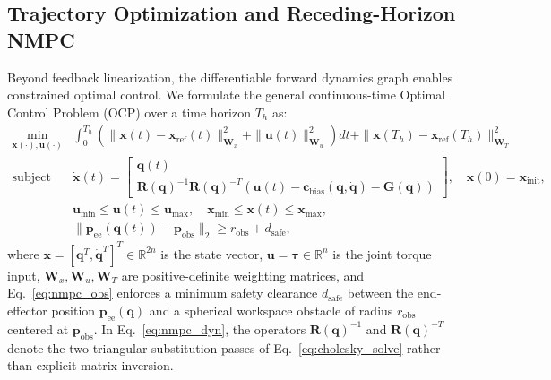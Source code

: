 \documentclass[fleqn,10pt]{article}
\begin{document}
\subsection{Trajectory Optimization and Receding-Horizon NMPC} \label{subsec:nmpc}
Beyond feedback linearization, the differentiable forward dynamics graph enables constrained optimal control. We formulate the general continuous-time Optimal Control Problem (OCP) over a time horizon $T_h$ as:
\begin{align}
	\min_{\bm{x}(\cdot), \bm{u}(\cdot)} & \int_0^{T_h} \left( \|\bm{x}(t) - \bm{x}_{\text{ref}}(t)\|_{\bm{W}_x}^2 + \|\bm{u}(t)\|_{\bm{W}_u}^2 \right) dt + \|\bm{x}(T_h) - \bm{x}_{\text{ref}}(T_h)\|_{\bm{W}_T}^2 \label{eq:nmpc_ocp} \\
	\text{subject to } & \dot{\bm{x}}(t) = \begin{bmatrix} \dot{\bm{q}}(t) \\ \bm{R}(\bm{q})^{-1}\bm{R}(\bm{q})^{-T}\left(\bm{u}(t) - \mathbf{c}_{\text{bias}}(\bm{q},\dot{\bm{q}}) - \bm{G}(\bm{q})\right) \end{bmatrix}, \quad \bm{x}(0) = \bm{x}_{\text{init}}, \label{eq:nmpc_dyn} \\
	& \bm{u}_{\min} \le \bm{u}(t) \le \bm{u}_{\max}, \quad \bm{x}_{\min} \le \bm{x}(t) \le \bm{x}_{\max}, \label{eq:nmpc_bounds} \\
	& \|\bm{p}_{\text{ee}}(\bm{q}(t)) - \bm{p}_{\text{obs}}\|_2 \ge r_{\text{obs}} + d_{\text{safe}}, \label{eq:nmpc_obs}
\end{align}
where $\bm{x} = [\bm{q}^T, \dot{\bm{q}}^T]^T \in \mathbb{R}^{2n}$ is the state vector, $\bm{u} = \bm{\tau} \in \mathbb{R}^n$ is the joint torque input, $\bm{W}_x, \bm{W}_u, \bm{W}_T$ are positive-definite weighting matrices, and Eq.~\eqref{eq:nmpc_obs} enforces a minimum safety clearance $d_{\text{safe}}$ between the end-effector position $\bm{p}_{\text{ee}}(\bm{q})$ and a spherical workspace obstacle of radius $r_{\text{obs}}$ centered at $\bm{p}_{\text{obs}}$. In Eq.~\eqref{eq:nmpc_dyn}, the operators $\bm{R}(\bm{q})^{-1}$ and $\bm{R}(\bm{q})^{-T}$ denote the two triangular substitution passes of Eq.~\eqref{eq:cholesky_solve} rather than explicit matrix inversion.
\end{document}
